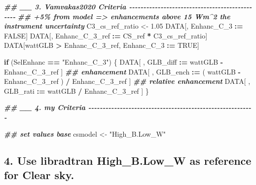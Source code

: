 \documentclass[
  10pt,
  a4paper,oneside]{article}
\newenvironment{Shaded}{\begin{snugshade}}{\end{snugshade}}
\newcommand{\ConstantTok}[1]{\textcolor[rgb]{0.56,0.35,0.01}{#1}}
\newcommand{\ControlFlowTok}[1]{\textcolor[rgb]{0.13,0.29,0.53}{\textbf{#1}}}
\newcommand{\DocumentationTok}[1]{\textcolor[rgb]{0.56,0.35,0.01}{\textbf{\textit{#1}}}}
\newcommand{\FloatTok}[1]{\textcolor[rgb]{0.00,0.00,0.81}{#1}}
\newcommand{\NormalTok}[1]{#1}
\newcommand{\OtherTok}[1]{\textcolor[rgb]{0.56,0.35,0.01}{#1}}
\newcommand{\SpecialCharTok}[1]{\textcolor[rgb]{0.81,0.36,0.00}{\textbf{#1}}}
\newcommand{\StringTok}[1]{\textcolor[rgb]{0.31,0.60,0.02}{#1}}
\begin{document}
\begin{Shaded}
\begin{Highlighting}[]
\DocumentationTok{\#\# \_\_ 3. Vamvakas2020  Criteria  {-}{-}{-}{-}{-}{-}{-}{-}{-}{-}{-}{-}{-}{-}{-}{-}{-}{-}{-}{-}{-}{-}{-}{-}{-}{-}{-}{-}{-}{-}{-}{-}{-}{-}{-}{-}{-}{-}{-}{-}{-}{-}{-}{-}{-}{-}{-}}
\DocumentationTok{\#\# +5\% from model =\textgreater{} enhancements above 15 Wm\^{}2 the instrument uncertainty}
\NormalTok{C3\_cs\_ref\_ratio }\OtherTok{\textless{}{-}} \FloatTok{1.05}
\NormalTok{DATA[, Enhanc\_C\_3 }\SpecialCharTok{:=} \ConstantTok{FALSE}\NormalTok{]}
\NormalTok{DATA[, Enhanc\_C\_3\_ref }\SpecialCharTok{:=}\NormalTok{ CS\_ref }\SpecialCharTok{*}\NormalTok{ C3\_cs\_ref\_ratio]}
\NormalTok{DATA[wattGLB }\SpecialCharTok{\textgreater{}}\NormalTok{ Enhanc\_C\_3\_ref,}
\NormalTok{     Enhanc\_C\_3 }\SpecialCharTok{:=} \ConstantTok{TRUE}\NormalTok{]}

\ControlFlowTok{if}\NormalTok{ (SelEnhanc }\SpecialCharTok{==} \StringTok{"Enhanc\_C\_3"}\NormalTok{) \{}
\NormalTok{    DATA[ , GLB\_diff }\SpecialCharTok{:=}\NormalTok{   wattGLB }\SpecialCharTok{{-}}\NormalTok{ Enhanc\_C\_3\_ref                    ] }\DocumentationTok{\#\# enhancement}
\NormalTok{    DATA[ , GLB\_ench }\SpecialCharTok{:=}\NormalTok{ ( wattGLB }\SpecialCharTok{{-}}\NormalTok{ Enhanc\_C\_3\_ref ) }\SpecialCharTok{/}\NormalTok{ Enhanc\_C\_3\_ref ] }\DocumentationTok{\#\# relative enhancement}
\NormalTok{    DATA[ , GLB\_rati }\SpecialCharTok{:=}\NormalTok{   wattGLB }\SpecialCharTok{/}\NormalTok{ Enhanc\_C\_3\_ref                    ]}
\NormalTok{\}}



\DocumentationTok{\#\# \_\_ 4. my Criteria  {-}{-}{-}{-}{-}{-}{-}{-}{-}{-}{-}{-}{-}{-}{-}{-}{-}{-}{-}{-}{-}{-}{-}{-}{-}{-}{-}{-}{-}{-}{-}{-}{-}{-}{-}{-}{-}{-}{-}{-}{-}{-}{-}{-}{-}{-}{-}{-}{-}{-}{-}{-}{-}{-}{-}{-}{-}{-}}

\DocumentationTok{\#\# set values base}
\NormalTok{csmodel }\OtherTok{\textless{}{-}} \StringTok{"High\_B.Low\_W"}
\end{Highlighting}
\end{Shaded}

\hypertarget{use-libradtran-high_b.low_w-as-reference-for-clear-sky.}{%
\subsection{\texorpdfstring{4. Use libradtran \textbf{High\_B.Low\_W} as reference for Clear sky.}{4. Use libradtran High\_B.Low\_W as reference for Clear sky.}}\label{use-libradtran-high_b.low_w-as-reference-for-clear-sky.}}
\end{document}
